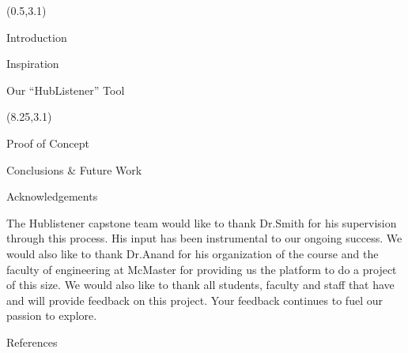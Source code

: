 \documentclass[22pt]{beamer}
\begin{document}
\begin{frame}[fragile]
\begin{textblock}{7.25}(0.5,3.1)


\begin{block}{Introduction}
\end{block}

\begin{block}{Inspiration }
\end{block}


\begin{block}{Our ``HubListener'' Tool}
\end{block}
\end{textblock}



\begin{textblock}{7.25}(8.25,3.1)
\begin{block}{Proof of Concept}
\end{block}


\begin{block}{Conclusions \& Future Work}
\end{block}

\begin{block}{Acknowledgements}
\end{block}
The Hublistener capstone team would like to thank Dr.Smith for his supervision through this process. His input has been instrumental to our ongoing success. 
We would also like to thank Dr.Anand for his organization of the course and the faculty of engineering at McMaster for providing us the platform to do  a project of this size. We would also like to thank all students, faculty and staff that have and will provide feedback on this project. Your feedback continues to fuel our passion to explore. 
\begin{block}{References}

{\scriptsize
}
\end{block}

\begin{figure}[htbp]
\end{figure}
\end{textblock}


\end{frame}
\end{document}
